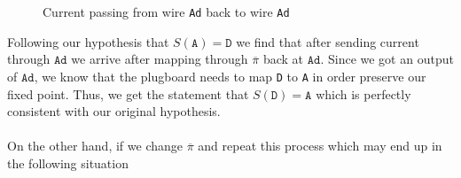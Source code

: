 \begin{figure}[H]
\begin{minipage}{0.45\textwidth}
  \end{minipage}
  \caption{Current passing from wire \texttt{Ad} back to wire \texttt{Ad}}
  \label{fig:correct_stecker}
\end{figure}
\noindent Following our hypothesis that $S(\texttt{A}) = \texttt{D}$
we find that after sending
current through $\texttt{Ad}$ we arrive after mapping through
$\overline\pi$ back at $\texttt{Ad}$. Since we got an output of
$\texttt{Ad}$, we know that the plugboard needs to map \texttt{D} to \texttt{A} in order preserve our fixed point. Thus, we
get the statement that $S(\texttt{D}) = \texttt{A}$ which is
perfectly consistent with our original hypothesis.
\\\\On the other hand, if we change
$\overline\pi$ and repeat this process which may end up in the
following situation
